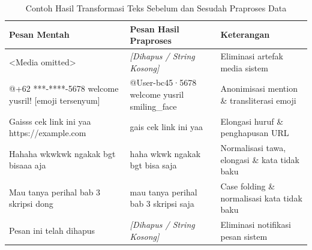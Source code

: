 \begingroup
\renewcommand{\arraystretch}{1.2}
\begin{table}[htbp]
\centering
\caption{Contoh Hasil Transformasi Teks Sebelum dan Sesudah Praproses Data}
\label{tab:contoh-hasil-praproses}
\scriptsize
\begin{tabular}{p{4.5cm} p{4.5cm} p{3.5cm}}
\toprule
\textbf{Pesan Mentah} & \textbf{Pesan Hasil Praproses} & \textbf{Keterangan} \\
\midrule
<Media omitted> & \textit{[Dihapus / String Kosong]} & Eliminasi artefak media sistem \\
@+62 ***-****-5678 welcome yusril! [emoji tersenyum] & @User-bc45·5678 welcome yusril smiling\_face & Anonimisasi mention \& transliterasi emoji \\
Gaisss cek link ini yaa https://example.com & gais cek link ini yaa & Elongasi huruf \& penghapusan URL \\
Hahaha wkwkwk ngakak bgt bisaaa aja & haha wkwk ngakak bgt bisa saja & Normalisasi tawa, elongasi \& kata tidak baku \\
Mau tanya perihal bab 3 skripsi dong & mau tanya perihal bab 3 skripsi saja & Case folding \& normalisasi kata tidak baku \\
Pesan ini telah dihapus & \textit{[Dihapus / String Kosong]} & Eliminasi notifikasi pesan sistem \\
\bottomrule
\end{tabular}
\end{table}
\endgroup
